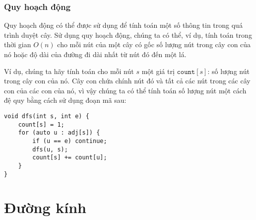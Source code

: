 \subsubsection{Quy hoạch động}

Quy hoạch động có thể được sử dụng để tính toán
một số thông tin trong quá trình duyệt cây.
Sử dụng quy hoạch động, chúng ta có thể, ví dụ,
tính toán trong thời gian $O(n)$ cho mỗi nút của một cây có gốc
số lượng nút trong cây con của nó
hoặc độ dài của đường đi dài nhất từ nút đó
đến một lá.

Ví dụ, chúng ta hãy tính toán cho mỗi nút $s$
một giá trị $\texttt{count}[s]$: số lượng nút trong cây con của nó.
Cây con chứa chính nút đó và
tất cả các nút trong các cây con của các con của nó,
vì vậy chúng ta có thể tính toán số lượng nút
một cách đệ quy bằng cách sử dụng đoạn mã sau:

\begin{lstlisting}
void dfs(int s, int e) {
    count[s] = 1;
    for (auto u : adj[s]) {
        if (u == e) continue;
        dfs(u, s);
        count[s] += count[u];
    }
}
\end{lstlisting}

\section{Đường kính}


